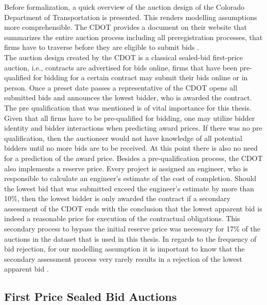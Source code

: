 \documentclass[a4paper,12pt, headsepline]{scrartcl}
\numberwithin{equation}{section}
\begin{document}
Before formalization, a quick overview of the auction design of the Colorado Department of Transportation is presented. This renders modelling assumptions more comprehensible. The CDOT provides a document on their website that summarizes the entire auction process including all preregistration processes, that firms have to traverse before they are eligible to submit bids \citep{CDOTRul}.\\
The auction design created by the CDOT is a classical sealed-bid first-price auction, i.e., contracts are advertised for bids online, firms that have been pre-qualified for bidding for a certain contract may submit their bids online or in person. Once a preset date passes a representative of the CDOT opens all submitted bids and announces the lowest bidder, who is awarded the contract. The pre qualification that was mentioned is of vital importance for this thesis. Given that all firms have to be pre-qualified for bidding, one may utilize bidder identity and bidder interactions when predicting award prices. If there was no pre qualification, then the auctioneer would not have knowledge of all potential bidders until no more bids are to be received. At this point there is also no need for a prediction of the award price. Besides a pre-qualification process, the CDOT also implements a reserve price. Every project is assigned an engineer, who is responsible to calculate an engineer's estimate of the cost of completion. Should the lowest bid that was submitted exceed the engineer's estimate by more than 10\%, then the lowest bidder is only awarded the contract if a secondary assessment of the CDOT ends with the conclusion that the lowest apparent bid is indeed a reasonable price for execution of the contractual obligations. This secondary process to bypass the initial reserve price was necessary for 17\% of the auctions in the dataset that is used in this thesis. In regards to the frequency of bid rejection, for our modelling assumption it is important to know that the secondary assessment process very rarely results in a rejection of the lowest apparent bid \citep{CDOTRul}. 

\subsection{First Price Sealed Bid Auctions}\label{subsec:fpsba}
\end{document}
